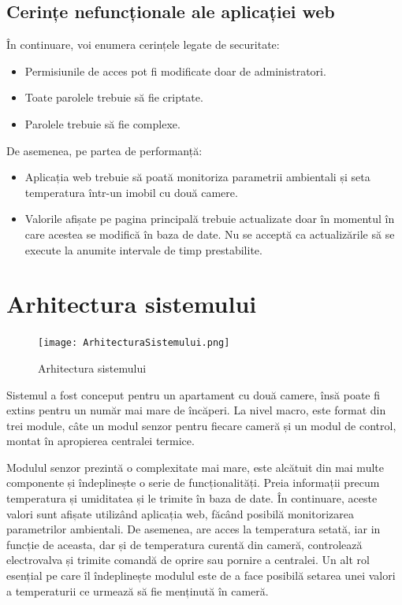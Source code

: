 \subsection{Cerințe nefuncționale ale aplicației web}

	În continuare, voi enumera cerințele legate de securitate:
	\begin{itemize}
		\setlength{\itemindent}{2em}
		\itemsep0em
		\item Permisiunile de acces pot fi modificate doar de administratori.
		\item Toate parolele trebuie să fie criptate.
		\item Parolele trebuie să fie complexe. 
	\end{itemize} 

\vspace{1em}

	De asemenea, pe partea de performanță:
	\begin{itemize}
		\setlength{\itemindent}{2em}
		\itemsep0em
		\item Aplicația web trebuie să poată monitoriza parametrii ambientali și seta temperatura într-un imobil cu două camere.
		\item Valorile afișate pe pagina principală trebuie actualizate doar în momentul în care acestea se modifică în baza de date. Nu se acceptă ca actualizările să se execute la anumite intervale de timp prestabilite. 
	\end{itemize} 
 

\section{Arhitectura sistemului}

\begin{figure}[H]
   	\centering
    	\texttt{[image: ArhitecturaSistemului.png]}
	\caption{Arhitectura sistemului}
\end{figure}

	Sistemul a fost conceput pentru un apartament cu două camere, însă poate fi extins pentru un număr mai mare de încăperi. La nivel macro, este format din trei module, câte un modul senzor pentru fiecare cameră și un modul de control, montat în apropierea centralei termice.

	Modulul senzor prezintă o complexitate mai mare, este alcătuit din mai multe componente și îndeplinește o serie de funcționalități. Preia informații precum temperatura și umiditatea și le trimite în baza de date. În continuare, aceste valori sunt afișate utilizând aplicația web, făcând posibilă monitorizarea parametrilor ambientali. De asemenea, are acces la temperatura setată, iar in funcție de aceasta, dar și de temperatura curentă din cameră, controlează electrovalva și trimite comandă de oprire sau pornire a centralei. Un alt rol esențial pe care îl îndeplinește modulul este de a face posibilă setarea unei valori a temperaturii ce urmează să fie menținută în cameră.

